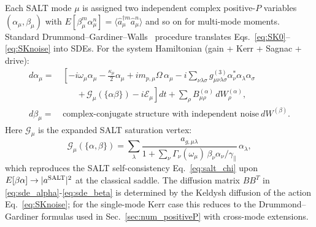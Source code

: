 \documentclass[11pt]{article}
\begin{document}
Each SALT mode $\mu$ is assigned two independent complex
positive-$P$ variables $(\alpha_\mu, \beta_\mu)$ with
$E[\beta_\mu^m \alpha_\mu^n] = \langle \hat a_\mu^{\dag m}\hat a_\mu^n\rangle$
and so on for multi-mode moments.  Standard
Drummond--Gardiner--Walls~\cite{DrummondGardiner1980,GardinerZoller2004}
procedure translates
Eqs.~\eqref{eq:SK0}--\eqref{eq:SKnoise} into SDEs.  For the system
Hamiltonian (gain + Kerr + Sagnac + drive):
\begin{align}
  d\alpha_\mu =&\,\left[-i\omega_\mu\alpha_\mu
    - \tfrac{\kappa_\mu}{2}\alpha_\mu
    + i m_{p,\mu}\Omega\,\alpha_\mu
    - i\sum_{\nu\lambda\sigma}g^{(3)}_{\mu\nu\lambda\sigma}\alpha_\nu^*\alpha_\lambda\alpha_\sigma
  \right.\nonumber\\
  &\qquad\left.+\,\mathcal{G}_\mu(\{\alpha\beta\}) - i\mathcal{E}_\mu\right]dt
    + \sum_\rho B^{(\alpha)}_{\mu\rho}\,dW_\rho^{(\alpha)},
  \label{eq:sde_alpha}\\
  d\beta_\mu =&\,\text{complex-conjugate structure with independent noise}
  \ dW^{(\beta)}.
  \label{eq:sde_beta}
\end{align}
Here $\mathcal{G}_\mu$ is the expanded SALT saturation vertex:
\begin{equation}
  \mathcal{G}_\mu(\{\alpha,\beta\}) = \sum_\lambda \frac{a_{g,\mu\lambda}}
    {1 + \sum_\nu \Gamma_\nu(\omega_\mu)\,\beta_\nu\alpha_\nu/\gamma_\|}\,
    \alpha_\lambda,
  \label{eq:gain_vertex}
\end{equation}
which reproduces the SALT self-consistency Eq.~\eqref{eq:salt_chi} upon
$E[\beta\alpha]\to|a^{\rm SALT}|^2$ at the classical saddle.  The
diffusion matrix $BB^T$ in \eqref{eq:sde_alpha}-\eqref{eq:sde_beta} is
determined by the Keldysh diffusion of the action
Eq.~\eqref{eq:SKnoise}; for the single-mode Kerr case this reduces to
the Drummond--Gardiner formulas used in Sec.~\ref{sec:num_positiveP}
with cross-mode extensions.
\end{document}
